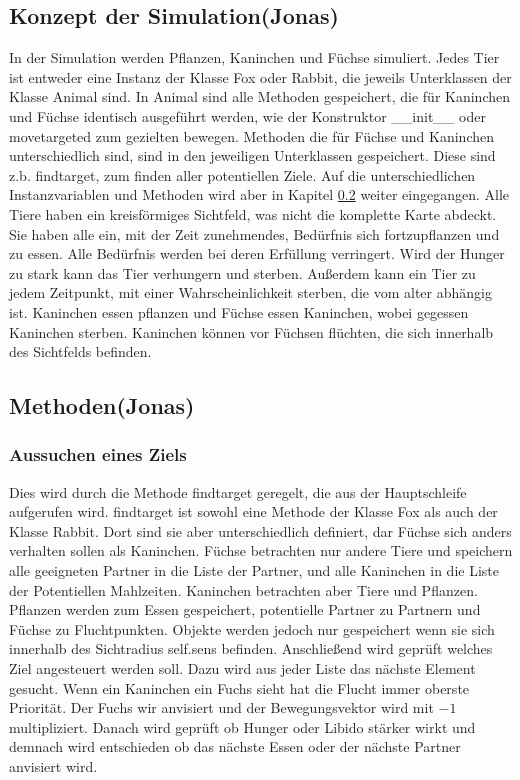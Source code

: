 \documentclass[12pt]{article}
\begin{document}
\subsection{Konzept der Simulation(Jonas)}
In der Simulation werden Pflanzen, Kaninchen und Füchse simuliert.
Jedes Tier ist entweder eine Instanz der Klasse \colorbox{gray!40}{Fox} oder
\colorbox{gray!40}{Rabbit}, die jeweils Unterklassen der Klasse
\colorbox{gray!40}{Animal} sind.
In Animal sind alle Methoden gespeichert, die für Kaninchen und Füchse
identisch ausgeführt werden, wie der Konstruktor
\colorbox{gray!40}{\_\_init\_\_} oder \colorbox{gray!40}{movetargeted} zum gezielten bewegen.
Methoden die für Füchse und Kaninchen unterschiedlich sind, sind in den
jeweiligen Unterklassen gespeichert.
Diese sind z.b. \colorbox{gray!40}{findtarget}, zum finden aller potentiellen Ziele.
Auf die unterschiedlichen Instanzvariablen und Methoden wird aber in Kapitel \ref{methoden} weiter eingegangen.
Alle Tiere haben ein kreisförmiges Sichtfeld, was nicht die komplette Karte abdeckt.
Sie haben alle ein, mit der Zeit zunehmendes, Bedürfnis sich fortzupflanzen und zu essen.
Alle Bedürfnis werden bei deren Erfüllung verringert.
Wird der Hunger zu stark kann das Tier verhungern und sterben.
Außerdem kann ein Tier zu jedem Zeitpunkt, mit einer Wahrscheinlichkeit sterben, die vom alter abhängig ist.
Kaninchen essen pflanzen und Füchse essen Kaninchen, wobei gegessen Kaninchen sterben.
Kaninchen können vor Füchsen flüchten, die sich innerhalb des Sichtfelds befinden.

\subsection{Methoden(Jonas)}
\label{methoden}
\subsubsection{Aussuchen eines Ziels}
Dies wird durch die Methode \colorbox{gray!40}{findtarget} geregelt, die aus der Hauptschleife aufgerufen wird.
\colorbox{gray!40}{findtarget} ist sowohl eine Methode der Klasse
\colorbox{gray!40}{Fox} als auch der Klasse \colorbox{gray!40}{Rabbit}.
Dort sind sie aber unterschiedlich definiert, dar Füchse sich anders verhalten sollen als Kaninchen.
Füchse betrachten nur andere Tiere und speichern alle geeigneten Partner in die Liste der Partner, und alle Kaninchen in die Liste der Potentiellen Mahlzeiten.
Kaninchen betrachten aber Tiere und Pflanzen.
Pflanzen werden zum Essen gespeichert, potentielle Partner zu Partnern und Füchse zu Fluchtpunkten.
Objekte werden jedoch nur gespeichert wenn sie sich innerhalb des Sichtradius \colorbox{gray!40}{self.sens} befinden.
Anschließend wird geprüft welches Ziel angesteuert werden soll.
Dazu wird aus jeder Liste das nächste Element gesucht.
Wenn ein Kaninchen ein Fuchs sieht hat die Flucht immer oberste Priorität.
Der Fuchs wir anvisiert und der Bewegungsvektor wird mit $-1$ multipliziert.
Danach wird geprüft ob Hunger oder Libido stärker wirkt und demnach wird
entschieden ob das nächste Essen oder der nächste Partner anvisiert wird.
\end{document}
